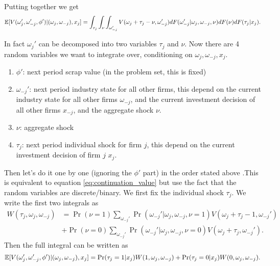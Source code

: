 \documentclass[12pt]{article}[margin=1in]
\begin{document}
Putting together we get 
\begin{equation}\label{eq:continuation_value}
    \mathbb{E}[V(\omega_j',\omega_{-j}',\phi')|(\omega_j, \omega_{-j}),x_j]=\int_{\tau_j} \int_\nu \int_{\omega_{-j}'} V(\omega_j+\tau_j-\nu, \omega_{-j}')dF(\omega_{-j}'|\omega_j,\omega_{-j},\nu)dF(\nu)dF(\tau_j|x_j).
\end{equation}

In fact $\omega_j'$ can be decomposed into two variables $\tau_j$ and $\nu$.  Now there are 4 random variables we want to integrate over, conditioning on $\omega_j, \omega_{-j}, x_j$.
\begin{enumerate}
    \item $\phi'$: next period scrap value (in the problem set, this is fixed)
    \item $\omega_{-j}'$: next period industry state for all other firms, this depend on the current industry state for all other firms $\omega_{-j}$, and the current investment decision of all other firms $x_{-j}$, and the aggregate shock $\nu$.
    \item $\nu$: aggregate shock
    \item $\tau_j$: next period individual shock for firm $j$, this depend on the current investment decision of firm $j$ $x_j$.
\end{enumerate}

Then let's do it one by one (ignoring the $\phi'$ part) in the order stated above .This is equivalent to equation \ref{eq:continuation_value} but use the fact that the random variables are discrete/binary.
We first fix the individual shock $\tau_j$. We write the first two integrals as
\begin{equation*}
    \begin{split}
        W(\tau_j,\omega_j,\omega_{-j})& =\Pr(\nu=1)\sum_{\omega_{-j}'}\Pr(\omega_{-j}'|\omega_j,\omega_{-j},\nu=1)V(\omega_j+\tau_j-1, \omega_{-j}')\\
        & +\Pr(\nu=0)\sum_{\omega_{-j}'}\Pr(\omega_{-j}'|\omega_j,\omega_{-j},\nu=0)V(\omega_j+\tau_j, \omega_{-j}').
    \end{split}
\end{equation*}
Then the full integral can be written as 
\begin{equation}\label{eq:continuation_value_m}
    \mathbb{E}[V(\omega_j',\omega_{-j}',\phi')|(\omega_j, \omega_{-j}),x_j]=\Pr(\tau_j=1|x_j)W(1, \omega_j,\omega_{-j})+ \Pr(\tau_j=0|x_j)W(0, \omega_j,\omega_{-j}).
\end{equation}
\end{document}

